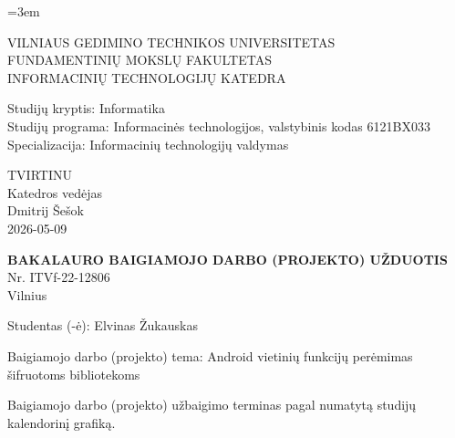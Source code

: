 \documentclass[11pt,a4paper]{report}
\renewcommand\_{{\textunderscore\allowbreak}}
\begin{document}
\clearpage
\thispagestyle{empty}

\begingroup
\renewcommand{\baselinestretch}{1.12}\selectfont
\setlength{\parindent}{0pt}
\setlength{\parskip}{0.55em}
\emergencystretch=3em
\normalsize

\begin{center}
    \MakeUppercase{Vilniaus Gedimino technikos universitetas}\\[0.25em]
    \MakeUppercase{Fundamentinių mokslų fakultetas}\\[0.25em]
    \MakeUppercase{Informacinių technologijų katedra}
\end{center}

\vspace{1.15cm}

\noindent
\begin{minipage}[t]{0.70\textwidth}
    \raggedright
    Studijų kryptis: Informatika\\[0.35em]
    Studijų programa: Informacinės technologijos, valstybinis kodas 6121BX033\\[0.35em]
    Specializacija: Informacinių technologijų valdymas
\end{minipage}\hfill
\begin{minipage}[t]{0.23\textwidth}
    \raggedright
    TVIRTINU\\[0.35em]
    Katedros vedėjas\\[0.35em]
    Dmitrij Šešok\\[0.35em]
    2026-05-09
\end{minipage}

\vspace{1.15cm}

\begin{center}
    \textbf{\MakeUppercase{Bakalauro baigiamojo darbo (projekto) užduotis}}\\[0.7em]
    Nr. ITVf-22-12806\\[0.7em]
    Vilnius
\end{center}

\vspace{0.8cm}

Studentas (-ė): Elvinas Žukauskas

Baigiamojo darbo (projekto) tema: Android vietinių funkcijų perėmimas šifruotoms bibliotekoms

Baigiamojo darbo (projekto) užbaigimo terminas pagal numatytą studijų kalendorinį grafiką.

\vspace{0.35cm}
\end{document}

